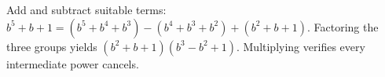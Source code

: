 Add and subtract suitable terms: $b^5+b+1=(b^5+b^4+b^3)-(b^4+b^3+b^2)+(b^2+b+1)$. Factoring the three groups yields $\boxed{(b^2+b+1)(b^3-b^2+1)}$. Multiplying verifies every intermediate power cancels.
